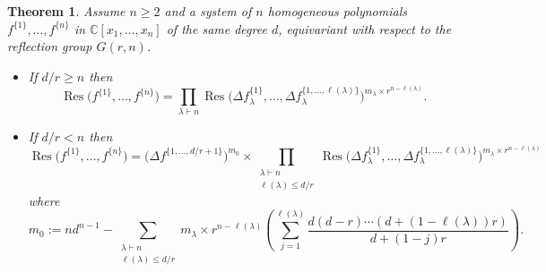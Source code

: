 \documentclass[12pt]{amsart}
\newtheorem{theorem}{Theorem}[section]
\theoremstyle{definition}
\newcommand{\Res}{\operatorname{Res}}
\DeclareMathOperator{\len}{\ell}
\begin{document}
\begin{theorem}
\label{thm:main2}
Assume $n \geqslant 2$ and a system of $n$ homogeneous polynomials $f^{\{1\}},\dots,f^{\{n\}}$ in $\mathbb{C}[x_1,\dots,x_n]$ of the same degree $d$, equivariant with respect to the reflection group $G(r,n)$.
\begin{itemize}
\item If $d/r \geqslant n$ then
\[
\Res\big(f^{\{1\}},\dots,f^{\{n\}}\big) = \prod_{\lambda \vdash n} \Res\Big(\Delta f^{\{1\}}_\lambda,\dots,\Delta f^{\{1,\dots,\len(\lambda)\}}_\lambda\Big)^{m_\lambda \times r^{n-\len(\lambda)}}.
\]
\item If $d/r < n$ then
\[
\Res\big(f^{\{1\}},\dots,f^{\{n\}}\big) = \Big(\Delta f^{\{1,\dots,d/r+1\}}\Big)^{m_0} \times \prod_{\substack{\lambda\vdash n\\ \len(\lambda)\leqslant d/r}} \Res\Big(\Delta f^{\{1\}}_\lambda,\dots,\Delta f^{\{1,\dots,\len(\lambda)\}}_\lambda\Big)^{m_\lambda \times r^{n-\len(\lambda)}}
\]
where
\[
m_0 := nd^{n-1} - \sum_{\substack{\lambda\vdash n\\ \len(\lambda)\leqslant d/r}} m_\lambda\times r^{n-\len(\lambda)}\left(\sum_{j=1}^{\len(\lambda)}\frac{d(d-r)\cdots(d+(1-\len(\lambda))r)}{d+(1-j)r}\right).
\]
\end{itemize}
\end{theorem}
\end{document}

